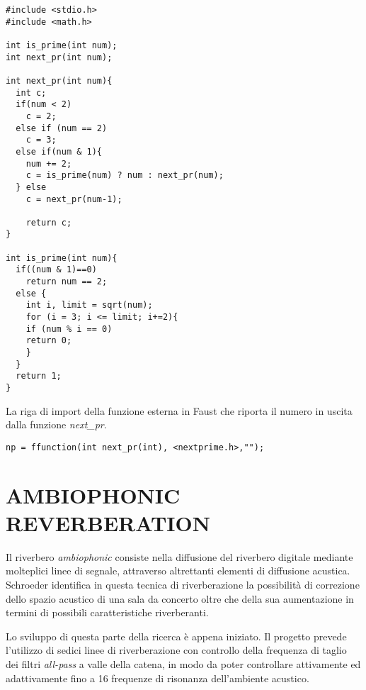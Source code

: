 \begin{lstlisting}
#include <stdio.h>
#include <math.h>

int is_prime(int num);
int next_pr(int num);

int next_pr(int num){
  int c;
  if(num < 2)
    c = 2;
  else if (num == 2)
    c = 3;
  else if(num & 1){
    num += 2;
    c = is_prime(num) ? num : next_pr(num);
  } else
    c = next_pr(num-1);

    return c;
}

int is_prime(int num){
  if((num & 1)==0)
    return num == 2;
  else {
    int i, limit = sqrt(num);
    for (i = 3; i <= limit; i+=2){
    if (num % i == 0)
    return 0;
    }
  }
  return 1;
}
\end{lstlisting}

La riga di import della funzione esterna in Faust che riporta il numero in
uscita dalla funzione \emph{next\_pr}.

\begin{lstlisting}
np = ffunction(int next_pr(int), <nextprime.h>,"");
\end{lstlisting}

\section*{AMBIOPHONIC REVERBERATION}

Il riverbero \emph{ambiophonic} consiste nella diffusione del riverbero digitale
mediante molteplici linee di segnale, attraverso altrettanti elementi di
diffusione acustica. Schroeder identifica in questa tecnica di riverberazione
la possibilità di correzione dello spazio acustico di una sala da concerto oltre
che della sua aumentazione in termini di possibili caratteristiche riverberanti.

Lo sviluppo di questa parte della ricerca è appena iniziato. Il progetto prevede
l'utilizzo di sedici linee di riverberazione con controllo della frequenza di
taglio dei filtri \emph{all-pass} a valle della catena, in modo da poter
controllare attivamente ed adattivamente fino a 16 frequenze di risonanza
dell'ambiente acustico.

